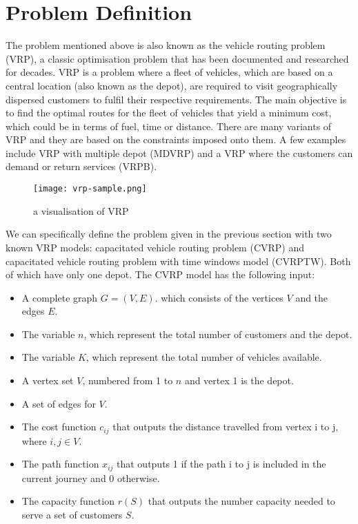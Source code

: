 \section{Problem Definition}
The problem mentioned above is also known as the vehicle routing problem (VRP), a classic optimisation problem that has been
documented and researched for decades. VRP is a problem where a fleet of vehicles, which are based on a central location (also known
as the depot), are required to visit geographically dispersed customers to fulfil their respective requirements. The main objective is
to find the optimal routes for the fleet of vehicles that yield a minimum cost, which could be in terms of fuel, time or distance.
There are many variants of VRP and they are based on the constraints imposed onto them. A few examples include VRP with multiple depot (MDVRP) and
a VRP where the customers can demand or return services (VRPB).
\begin{figure}[!ht]
  \centering
    \texttt{[image: vrp-sample.png]}
    \caption{a visualisation of VRP}
\end{figure}

We can specifically define the problem given in the previous section with two known VRP models: capacitated
vehicle routing problem (CVRP) and capacitated vehicle routing problem
with time windows model (CVRPTW). Both of which have only one depot. The CVRP model has the following input:
\begin{itemize}
\item A complete graph \(G = (V, E)\). which consists of the vertices \(V\) and the edges \(E\).
\item The variable \(n\), which represent the total number of customers and the depot.
\item The variable \(K\), which represent the total number of vehicles available.
\item A vertex set \(V\), numbered from 1 to \(n\) and vertex 1 is the depot.
\item A set of edges for \(V\).
\item The cost function \(c_{ij}\) that outputs the distance travelled from vertex i to j, where \(i,j \in V\).
\item The path function \(x_{ij}\) that outputs 1 if the path i to j is included in the current journey and 0 otherwise.
\item The capacity function \(r(S)\) that outputs the number capacity needed to serve a set of customers \(S\).
\end{itemize}

